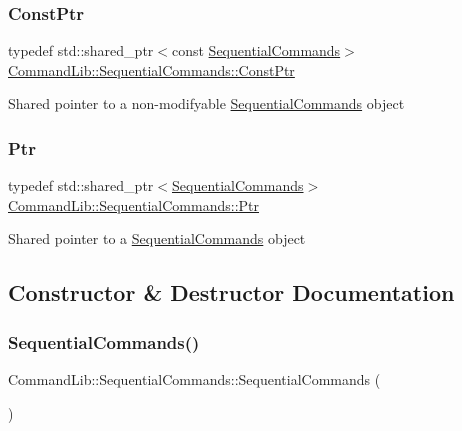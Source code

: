 \subsubsection{\texorpdfstring{Const\+Ptr}{ConstPtr}}
{\footnotesize\ttfamily typedef std\+::shared\+\_\+ptr$<$const \mbox{\hyperlink{class_command_lib_1_1_sequential_commands}{Sequential\+Commands}}$>$ \mbox{\hyperlink{class_command_lib_1_1_sequential_commands_a833e8df5749f6f13b93eaa1d724799e9}{Command\+Lib\+::\+Sequential\+Commands\+::\+Const\+Ptr}}}



Shared pointer to a non-\/modifyable \mbox{\hyperlink{class_command_lib_1_1_sequential_commands}{Sequential\+Commands}} object

\mbox{\label{class_command_lib_1_1_sequential_commands_adf77d8fcaebe414c283e553ba0604228}} 
\subsubsection{\texorpdfstring{Ptr}{Ptr}}
{\footnotesize\ttfamily typedef std\+::shared\+\_\+ptr$<$\mbox{\hyperlink{class_command_lib_1_1_sequential_commands}{Sequential\+Commands}}$>$ \mbox{\hyperlink{class_command_lib_1_1_sequential_commands_adf77d8fcaebe414c283e553ba0604228}{Command\+Lib\+::\+Sequential\+Commands\+::\+Ptr}}}



Shared pointer to a \mbox{\hyperlink{class_command_lib_1_1_sequential_commands}{Sequential\+Commands}} object



\subsection{Constructor \& Destructor Documentation}
\mbox{\label{class_command_lib_1_1_sequential_commands_ab4cbf775a047942c6fce735980f19bb0}} 
\subsubsection{\texorpdfstring{Sequential\+Commands()}{SequentialCommands()}}
{\footnotesize\ttfamily Command\+Lib\+::\+Sequential\+Commands\+::\+Sequential\+Commands (\begin{DoxyParamCaption}{ }\end{DoxyParamCaption})\hspace{0.3cm}{\ttfamily [protected]}}



